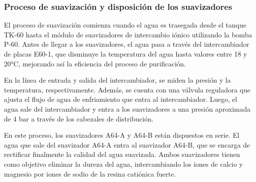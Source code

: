 
\subsubsection*{Proceso de suavización y disposición de los suavizadores}

El proceso de suavización comienza cuando el agua es trasegada desde el tanque TK-60 hasta el módulo de suavizadores de intercambio iónico utilizando la bomba P-60. Antes de llegar a los suavizadores, el agua pasa a través del intercambiador de placas E60-1, que disminuye la temperatura del agua hasta valores entre 18 y 20°C, mejorando así la eficiencia del proceso de purificación.


En la línea de entrada y salida del intercambiador, se miden la presión y la temperatura, respectivamente. Además, se cuenta con una válvula reguladora que ajusta el flujo de agua de enfriamiento que entra al intercambiador. Luego, el agua sale del intercambiador y entra a los suavizadores a una presión aproximada de 4 bar a través de los cabezales de distribución.


En este proceso, los suavizadores A64-A y A64-B están dispuestos en serie. El agua que sale del suavizador A64-A entra al suavizador A64-B, que se encarga de rectificar finalmente la calidad del agua suavizada. Ambos suavizadores tienen como objetivo eliminar la dureza del agua, intercambiando los iones de calcio y magnesio por iones de sodio de la resina catiónica fuerte.

